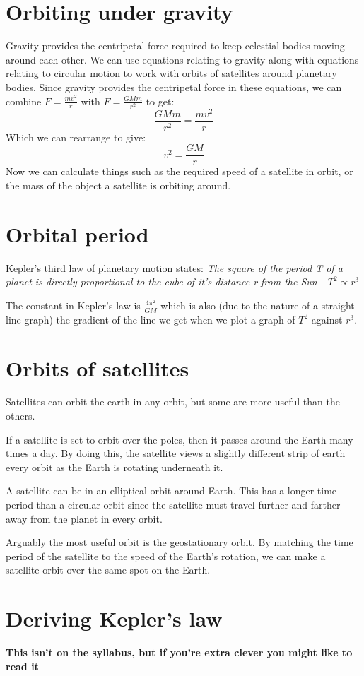\documentclass{article}
\begin{document}
\section*{Orbiting under gravity}
Gravity provides the centripetal force required to keep celestial bodies moving
around each other. We can use equations relating to gravity along with equations
relating to circular motion to work with orbits of satellites around planetary
bodies. Since gravity provides the centripetal force in these equations, we can
combine $F = \frac{mv^{2}}{r}$ with $F = \frac{GMm}{r^2}$ to get:
\[
	\frac{GMm}{r^2} = \frac{mv^{2}}{r}
\]
Which we can rearrange to give:
\[
	v^{2} = \frac{GM}{r}
\]
Now we can calculate things such as the required speed of a satellite in orbit,
or the mass of the object a satellite is orbiting around.

\section*{Orbital period}
Kepler's third law of planetary motion states: \textit{The square of the period
T of a planet is directly proportional to the cube of it's distance r from the
Sun - $T^2 \propto r^3$}

The constant in Kepler's law is $\frac{4 \pi ^2}{GM}$ which is also (due to the
nature of a straight line graph) the gradient of the line we get when we plot a
graph of $T^2$ against $r^3$.

\section*{Orbits of satellites}
Satellites can orbit the earth in any orbit, but some are more useful than the
others.

If a satellite is set to orbit over the poles, then it passes around the Earth
many times a day. By doing this, the satellite views a slightly different strip
of earth every orbit as the Earth is rotating underneath it.

A satellite can be in an elliptical orbit around Earth. This has a longer time
period than a circular orbit since the satellite must travel further and farther
away from the planet in every orbit.

Arguably the most useful orbit is the geostationary orbit. By matching the time
period of the satellite to the speed of the Earth's rotation, we can make a
satellite orbit over the same spot on the Earth.

\section*{Deriving Kepler's law}
\textbf{This isn't on the syllabus, but if you're extra clever you might like to
read it}
\end{document}
